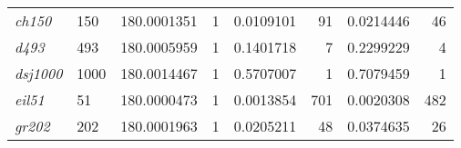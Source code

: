 \begin{table}[H]
\begin{tabular}{llrrrrrr}
  \textit{ch150}         & 150        & 180.0001351                                                                                 & 1                                                                             & 0.0109101                                                                               & 91                                                                            & 0.0214446                                                                                 & 46                                                                              \\
  \textit{d493}          & 493        & 180.0005959                                                                                 & 1                                                                             & 0.1401718                                                                               & 7                                                                             & 0.2299229                                                                                 & 4                                                                               \\
  \textit{dsj1000}       & 1000       & 180.0014467                                                                                 & 1                                                                             & 0.5707007                                                                               & 1                                                                             & 0.7079459                                                                                 & 1                                                                               \\
  \textit{eil51}         & 51         & 180.0000473                                                                                 & 1                                                                             & 0.0013854                                                                               & 701                                                                           & 0.0020308                                                                                 & 482                                                                             \\
  \textit{gr202}         & 202        & 180.0001963                                                                                 & 1                                                                             & 0.0205211                                                                               & 48                                                                            & 0.0374635                                                                                 & 26                                                                              \\

\end{tabular}
\end{table}
